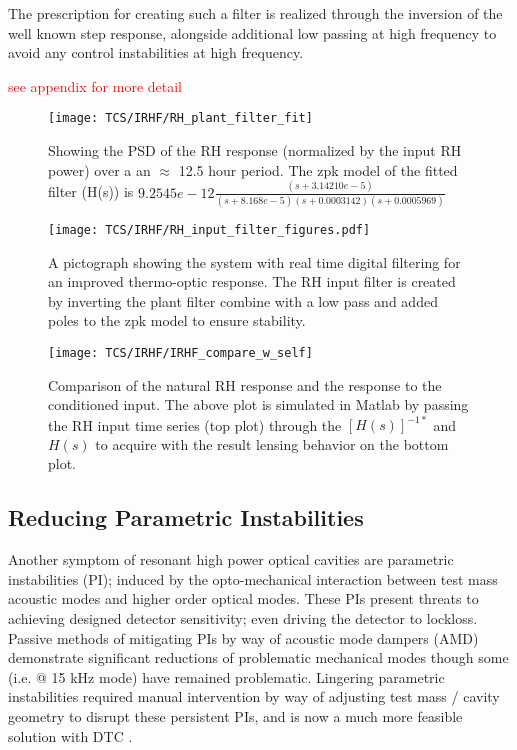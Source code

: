 The prescription for creating such a filter is realized through the inversion of the well known step response, alongside additional low passing at high frequency to avoid any control instabilities at high frequency.

\textcolor{red}{see appendix for more detail}

\begin{figure}[H]
\texttt{[image: TCS/IRHF/RH\_plant\_filter\_fit]}
\caption{Showing the PSD of the RH response (normalized by the input RH power) over a an $\approx$ 12.5 hour period. The zpk model of the fitted filter (H(s)) is $9.2545e-12 \frac{(s+3.14210e-5)}{(s+8.168e-5)(s+0.0003142)(s+0.0005969)}$}
\label{fig:plant_v_fit}
\end{figure}

\begin{figure}[H]
\centering
\texttt{[image: TCS/IRHF/RH\_input\_filter\_figures.pdf]}
\caption{A pictograph showing the system with real time digital filtering for an improved thermo-optic response. The RH input filter is created by inverting the plant filter combine with a low pass and added poles to the zpk model to ensure stability.}
\label{fig:rtdf_pictograph}
\end{figure}

\begin{figure}[H]
\texttt{[image: TCS/IRHF/IRHF\_compare\_w\_self]}
\caption{Comparison of the natural RH response and the response to the conditioned input. The above plot is simulated in Matlab by passing the RH input time series (top plot) through the $[H(s)]^{-1*}$ and $H(s)$ to acquire with the result lensing behavior on the bottom plot.}
\label{fig:dynam_comparison}
\end{figure}
\newpage

\subsection{Reducing Parametric Instabilities}
Another symptom of resonant high power optical cavities are parametric instabilities (PI); induced by the opto-mechanical interaction between test mass acoustic modes and higher order optical modes. These PIs present threats to achieving designed detector sensitivity; even driving the detector to lockloss. Passive methods of mitigating PIs by way of acoustic mode dampers (AMD) demonstrate significant reductions of problematic mechanical modes though some (i.e. @ 15 kHz mode) have remained problematic. Lingering parametric instabilities required manual intervention by way of adjusting test mass / cavity geometry to disrupt these persistent PIs, and is now a much more feasible solution with DTC \cite{Hardwick_2020}.  

